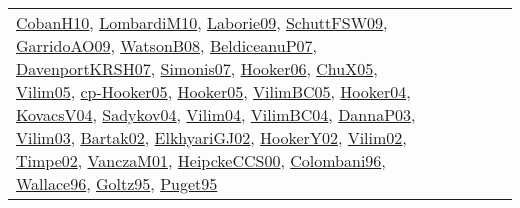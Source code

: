 {\begin{longtable}{llp{6cm}p{6cm}p{6cm}}
\href{papers/CobanH10.pdf}{CobanH10}\cite{CobanH10}, \href{papers/LombardiM10.pdf}{LombardiM10}\cite{LombardiM10}, \href{papers/Laborie09.pdf}{Laborie09}\cite{Laborie09}, \href{papers/SchuttFSW09.pdf}{SchuttFSW09}\cite{SchuttFSW09}, \href{articles/GarridoAO09.pdf}{GarridoAO09}\cite{GarridoAO09}, \href{papers/WatsonB08.pdf}{WatsonB08}\cite{WatsonB08}, \href{papers/BeldiceanuP07.pdf}{BeldiceanuP07}\cite{BeldiceanuP07}, \href{papers/DavenportKRSH07.pdf}{DavenportKRSH07}\cite{DavenportKRSH07}, \href{articles/Simonis07.pdf}{Simonis07}\cite{Simonis07}, \href{articles/Hooker06.pdf}{Hooker06}\cite{Hooker06}, \href{papers/ChuX05.pdf}{ChuX05}\cite{ChuX05}, \href{papers/Vilim05.pdf}{Vilim05}\cite{Vilim05}, \href{papers/cp-Hooker05.pdf}{cp-Hooker05}\cite{cp-Hooker05}, \href{articles/Hooker05.pdf}{Hooker05}\cite{Hooker05}, \href{articles/VilimBC05.pdf}{VilimBC05}\cite{VilimBC05}, \href{papers/Hooker04.pdf}{Hooker04}\cite{Hooker04}, \href{papers/KovacsV04.pdf}{KovacsV04}\cite{KovacsV04}, \href{papers/Sadykov04.pdf}{Sadykov04}\cite{Sadykov04}, \href{papers/Vilim04.pdf}{Vilim04}\cite{Vilim04}, \href{papers/VilimBC04.pdf}{VilimBC04}\cite{VilimBC04}, \href{papers/DannaP03.pdf}{DannaP03}\cite{DannaP03}, \href{papers/Vilim03.pdf}{Vilim03}\cite{Vilim03}, \href{papers/Bartak02.pdf}{Bartak02}\cite{Bartak02}, \href{papers/ElkhyariGJ02.pdf}{ElkhyariGJ02}\cite{ElkhyariGJ02}, \href{papers/HookerY02.pdf}{HookerY02}\cite{HookerY02}, \href{papers/Vilim02.pdf}{Vilim02}\cite{Vilim02}, \href{articles/Timpe02.pdf}{Timpe02}\cite{Timpe02}, \href{papers/VanczaM01.pdf}{VanczaM01}\cite{VanczaM01}, \href{articles/HeipckeCCS00.pdf}{HeipckeCCS00}\cite{HeipckeCCS00}, \href{papers/Colombani96.pdf}{Colombani96}\cite{Colombani96}, \href{articles/Wallace96.pdf}{Wallace96}\cite{Wallace96}, \href{papers/Goltz95.pdf}{Goltz95}\cite{Goltz95}, \href{papers/Puget95.pdf}{Puget95}\cite{Puget95}\\

\end{longtable}}
